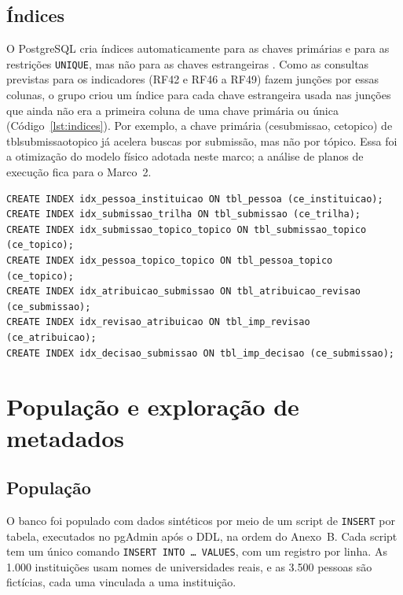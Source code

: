 \documentclass[12pt,a4paper]{article}
\newcommand{\tbus}{\textunderscore\allowbreak}
\newcommand{\tb}[1]{{\ttfamily\let\_\tbus #1}}
\begin{document}
\subsection{Índices}
O PostgreSQL cria índices automaticamente para as chaves primárias e para as
restrições \texttt{UNIQUE}, mas não para as chaves estrangeiras \citep{postgresql}.
Como as consultas previstas para os indicadores (RF42 e RF46 a RF49) fazem junções
por essas colunas, o grupo criou um índice para cada chave estrangeira usada nas
junções que ainda não era a primeira coluna de uma chave primária ou única
(Código~\ref{lst:indices}). Por exemplo, a chave primária (\tb{ce\_submissao},
\tb{ce\_topico}) de \tb{tbl\_submissao\_topico} já acelera buscas por submissão, mas
não por tópico. Essa foi a otimização do modelo físico adotada neste marco; a análise
de planos de execução fica para o Marco~2.

\begin{lstlisting}[float=htbp,caption={Índices criados nas chaves estrangeiras (trecho do \tb{schema.sql}).},label={lst:indices}]
CREATE INDEX idx_pessoa_instituicao ON tbl_pessoa (ce_instituicao);
CREATE INDEX idx_submissao_trilha ON tbl_submissao (ce_trilha);
CREATE INDEX idx_submissao_topico_topico ON tbl_submissao_topico (ce_topico);
CREATE INDEX idx_pessoa_topico_topico ON tbl_pessoa_topico (ce_topico);
CREATE INDEX idx_atribuicao_submissao ON tbl_atribuicao_revisao (ce_submissao);
CREATE INDEX idx_revisao_atribuicao ON tbl_imp_revisao (ce_atribuicao);
CREATE INDEX idx_decisao_submissao ON tbl_imp_decisao (ce_submissao);
\end{lstlisting}

\section{População e exploração de metadados}\label{sec:populacao}

\subsection{População}
O banco foi populado com dados sintéticos por meio de um script de \texttt{INSERT} por
tabela, executados no pgAdmin após o DDL, na ordem do Anexo~B. Cada script tem um único
comando \texttt{INSERT INTO \dots\ VALUES}, com um registro por linha. As 1.000
instituições usam nomes de universidades reais, e as 3.500 pessoas são fictícias, cada
uma vinculada a uma instituição.
\end{document}

